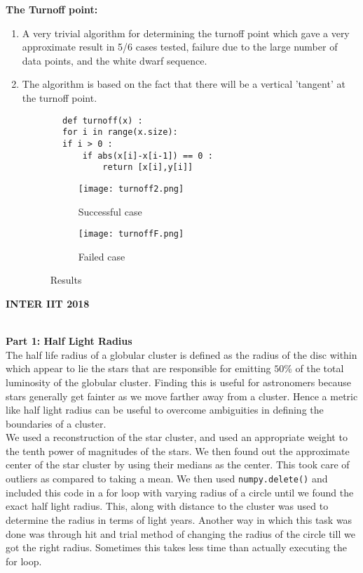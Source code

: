 \documentclass{article}
\begin{document}
\textbf{\Large The Turnoff point:}
\begin{enumerate}
    \item A very trivial algorithm for determining the turnoff point which gave a very approximate result in 5/6 cases tested, failure due to the large number of data points, and the white dwarf sequence.
    \item The algorithm is based on the fact that there will be a vertical 'tangent' at the turnoff point. 
    \begin{verbatim}
        def turnoff(x) :
        for i in range(x.size):
        if i > 0 :
            if abs(x[i]-x[i-1]) == 0 :
                return [x[i],y[i]]
    \end{verbatim}
    
    \begin{figure}[H]
    \centering
    \begin{subfigure}{.5\textwidth}
      \centering
      \texttt{[image: turnoff2.png]}
      \caption{Successful case}
    \end{subfigure}%
    \begin{subfigure}{.5\textwidth}
      \centering
      \texttt{[image: turnoffF.png]}
      \caption{Failed case}
    \end{subfigure}
    \caption{Results}
    \end{figure}
\end{enumerate}\newpage
\begin{center}\textbf{\Huge INTER IIT 2018}\end{center}\newline
\\
\textbf{\Large Part 1: Half Light Radius}\newline\\
The half life radius of a globular cluster is defined as the radius of the disc within which appear to lie the stars that are responsible for emitting $50\%$ of the total luminosity of the globular cluster. Finding this is useful for astronomers because stars generally get fainter as we move farther away from a cluster. Hence a metric like half light radius can be useful to overcome ambiguities in defining the boundaries of a cluster.\newline\\
We used a reconstruction of the star cluster, and used an appropriate weight to the tenth power of magnitudes of the stars. We then found out the approximate center of the star cluster by using their medians as the center. This took care of outliers as compared to taking a mean. We then used \texttt{numpy.delete()} and included this code in a for loop with varying radius of a circle until we found the exact half light radius. This, along with distance to the cluster was used to determine the radius in terms of light years.\newline
Another way in which this task was done was through hit and trial method of changing the radius of the circle till we got the right radius. Sometimes this takes less time than actually executing the for loop. 
\end{document}
